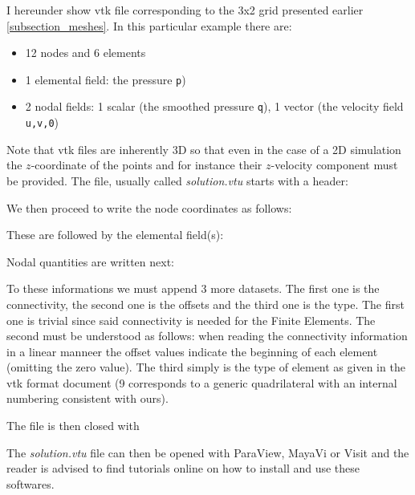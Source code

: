 \documentclass[a4paper]{article}
\begin{document}
I hereunder show vtk file corresponding to the 3x2 grid presented earlier \ref{subsection_meshes}.
In this particular example there are:
\begin{itemize}
\item 12 nodes and 6 elements
\item 1 elemental field: the pressure {\tt p})
\item 2 nodal fields: 1 scalar (the smoothed pressure {\tt q}), 1 vector (the velocity field {\tt u,v,0})
\end{itemize}
Note that vtk files are inherently 3D so that even in the case of a 2D simulation the $z$-coordinate 
of the points and for instance their $z$-velocity component must be provided.
The file, usually called {\sl solution.vtu} starts with a header:



We then proceed to write the node coordinates as follows:



These are followed by the elemental field(s):



Nodal quantities are written next:



To these informations we must append 3 more datasets. The first one is the connectivity, 
the second one is the offsets and the third one is the type. The first one is trivial
since said connectivity is needed for the Finite Elements. The second must be understood as follows:
when reading the connectivity information in a linear manneer the offset values 
indicate the beginning of each element (omitting the zero value). The third simply is the type of element 
as given in the vtk format document (9 corresponds to a generic quadrilateral with an 
internal numbering consistent with ours). 



The file is then closed with



The {\sl solution.vtu} file can then be opened with ParaView, MayaVi or Visit and the reader 
is advised to find tutorials online on how to install and use these softwares. 
\end{document}
